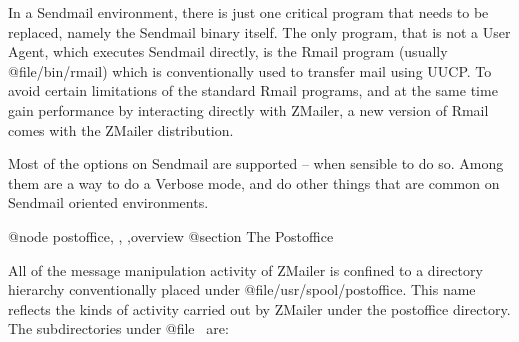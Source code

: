 In a Sendmail environment, there is just one critical program that
needs to be replaced, namely the Sendmail binary itself.
The only program, that is not a User Agent, which executes Sendmail
directly, is the Rmail program (usually @file{/bin/rmail}) which
is conventionally used to transfer mail using UUCP.
To avoid certain limitations of the standard Rmail programs, and
at the same time gain performance by interacting directly with ZMailer,
a new version of Rmail comes with the ZMailer distribution.

Most of the options on Sendmail are supported -- when sensible to do so.
Among them are a way to do a Verbose mode, and do other things that
are common on Sendmail oriented environments.

@node postoffice, , ,overview
@section The Postoffice

All of the message manipulation activity of ZMailer is confined to a
directory hierarchy conventionally placed under @file{/usr/spool/postoffice}.
This name reflects the kinds of activity carried out by ZMailer under the
postoffice directory.  The subdirectories under @file{~} are:


